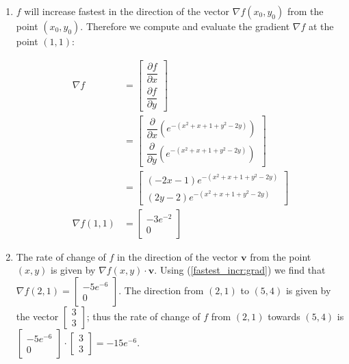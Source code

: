 \item

 \begin{enumerate}
  \item $f$ will increase fastest in the direction of the vector
   $\nabla f(x_0,y_0)$ from the point $(x_0, y_0)$.  Therefore we compute and
   evaluate the gradient $\nabla f$ at the point $(1, 1)$:

   \begin{align*}
    \nabla f &= \begin{bmatrix}
                 \dfrac{\partial f}{\partial x} \\
                 \dfrac{\partial f}{\partial y}
                \end{bmatrix} \\
             &= \begin{bmatrix}
                 \dfrac{\partial}{\partial x}(e^{-(x^2+x+1+y^2-2y)}) \\
                 \dfrac{\partial}{\partial y}(e^{-(x^2+x+1+y^2-2y)})
                \end{bmatrix} \tag{1} \label{fastest_incr:grad}  \\
             &= \begin{bmatrix}
                 (-2x - 1)e^{-(x^2+x+1+y^2-2y)} \\
                 (2y - 2)e^{-(x^2+x+1+y^2-2y)}
                \end{bmatrix} \\
    \nabla f(1, 1) &= \begin{bmatrix} -3e^{-2} \\ 0 \end{bmatrix}
   \end{align*}

 \item The rate of change of $f$ in the direction of the vector $\mathbf{v}$
  from the point $(x, y)$ is given by $\nabla f(x,y) \cdot \mathbf{v}$.  Using
  (\ref{fastest_incr:grad}) we find that $\nabla f(2, 1) =
  \begin{bmatrix} -5e^{-6} \\ 0 \end{bmatrix}$.  The direction from $(2, 1)$
  to $(5, 4)$ is given by the vector $\begin{bmatrix} 3 \\ 3 \end{bmatrix}$;
  thus the rate of change of $f$ from $(2, 1)$ towards $(5, 4)$ is
  $\begin{bmatrix} -5e^{-6} \\ 0 \end{bmatrix} \cdot
   \begin{bmatrix} 3 \\ 3 \end{bmatrix} = -15e^{-6}$.

 \end{enumerate}

